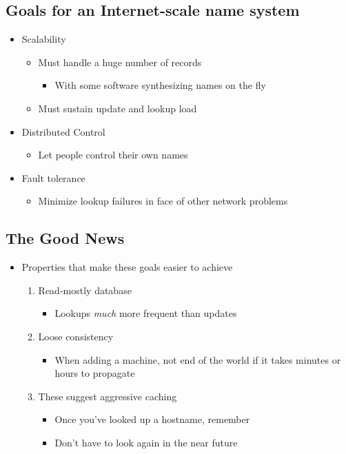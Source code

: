 \subsection{Goals for an Internet-scale name system}
\begin{itemize}[nosep]
    \item Scalability
          \begin{itemize}[nosep]
              \item Must handle a huge number of records
                    \begin{itemize}[nosep]
                        \item With some software synthesizing names on the fly
                    \end{itemize}
              \item Must sustain update and lookup load
          \end{itemize}
    \item Distributed Control
          \begin{itemize}[nosep]
              \item Let people control their own names
          \end{itemize}
    \item Fault tolerance
          \begin{itemize}[nosep]
              \item Minimize lookup failures in face of other network problems
          \end{itemize}
\end{itemize}
\subsection{The Good News}
\begin{itemize}[nosep]
    \item Properties that make these goals easier to achieve
          \begin{enumerate}[nosep]
              \item Read-mostly database
                    \begin{itemize}[nosep]
                        \item Lookups \emph{much} more frequent than updates
                    \end{itemize}
              \item Loose consistency
                    \begin{itemize}[nosep]
                        \item When adding a machine, not end of the world if it takes minutes or hours to propagate
                    \end{itemize}
              \item These suggest aggressive caching
                    \begin{itemize}[nosep]
                        \item Once you've looked up a hostname, remember
                        \item Don't have to look again in the near future
                    \end{itemize}
          \end{enumerate}
\end{itemize}
